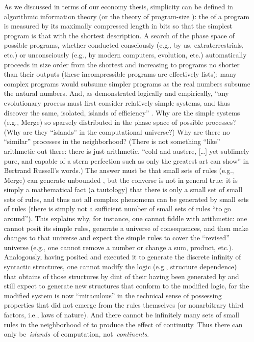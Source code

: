 \documentclass[output=paper]{langsci/langscibook}
\begin{document}
As we discussed in terms of our economy thesis, simplicity can
be defined in algorithmic information theory (or the theory of program-size
): the  of a program is measured by its maximally
compressed length in bits so that the simplest program is that with the
shortest description. A search of the phase space of possible
programs, whether conducted consciously (e.g., by us, extraterrestrials, etc.)
or unconsciously (e.g., by modern computers, evolution, etc.) automatically
proceeds in size order from the shortest and increasing to programs no shorter
than their outputs (these incompressible programs are effectively lists); many
complex programs would subsume simpler programs as the real numbers subsume the
natural numbers. And, as demonstrated logically and empirically,
“any evolutionary process must first consider relatively simple systems, and
thus discover the same, isolated, islands of efficiency”
\citep[122]{Minsky1985}. Why are the simple systems (e.g., Merge) so sparsely
distributed in the phase space of possible processes? (Why are they
“islands”
in the computational universe?) Why are there no “similar” processes in the
neighborhood? (There is not something “like” arithmetic out there: there is
just arithmetic, “cold and austere, […] yet sublimely pure, and capable of a
stern perfection such as only the greatest art can show” in Bertrand Russell’s
words.) The answer must be that small sets of rules (e.g., Merge) can generate
unbounded , but the converse is not in general true: it is simply a
mathematical fact (a tautology) that there is only a small set of small sets of
rules, and thus not all complex phenomena can be generated by small sets of
rules (there is simply not a sufficient number of small sets of rules “to go
around”). This explains why, for instance, one cannot fiddle with arithmetic:
one cannot posit its simple rules, generate a universe of consequences, and
then make changes to that universe and expect the simple rules to cover the
“revised” universe (e.g., one cannot remove a number or change a sum, product,
etc.). Analogously, having posited  and executed it to generate the
discrete infinity of syntactic structures, one cannot modify the logic (e.g.,
structure dependence) that obtains of those structures by dint of their having
been generated by  and still expect  to generate new structures that
conform to the modified logic, for the modified system is now “miraculous” in
the technical sense of possessing properties that did not emerge from the rules
themselves (or nonarbitrary third factors, i.e., laws of nature). And there
cannot be infinitely many sets of small rules in the neighborhood of  to
produce the effect of continuity. Thus there can only be~\emph{islands}~of
computation, not~\emph{continents}.
\end{document}
